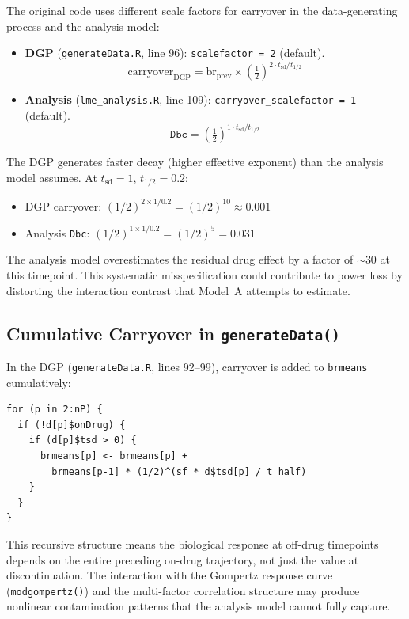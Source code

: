 \documentclass[11pt]{article}
\begin{document}
The original code uses different scale factors for carryover in the
data-generating process and the analysis model:

\begin{itemize}[nosep]
  \item \textbf{DGP} (\texttt{generateData.R}, line 96):
    \texttt{scalefactor = 2} (default).
    \[
      \text{carryover}_{\text{DGP}} =
        \text{br}_{\text{prev}} \times
        \left(\tfrac{1}{2}\right)^{2 \cdot t_{\text{sd}} / t_{1/2}}
    \]

  \item \textbf{Analysis} (\texttt{lme\_analysis.R}, line 109):
    \texttt{carryover\_scalefactor = 1} (default).
    \[
      \texttt{Dbc} =
        \left(\tfrac{1}{2}\right)^{1 \cdot t_{\text{sd}} / t_{1/2}}
    \]
\end{itemize}

The DGP generates faster decay (higher effective exponent) than the
analysis model assumes. At $t_{\text{sd}} = 1$, $t_{1/2} = 0.2$:

\begin{itemize}[nosep]
  \item DGP carryover: $(1/2)^{2 \times 1/0.2} = (1/2)^{10}
    \approx 0.001$
  \item Analysis \texttt{Dbc}: $(1/2)^{1 \times 1/0.2} = (1/2)^{5}
    = 0.031$
\end{itemize}

The analysis model overestimates the residual drug effect by a factor
of $\sim$30 at this timepoint. This systematic misspecification could
contribute to power loss by distorting the interaction contrast that
Model~A attempts to estimate.

\subsection{Cumulative Carryover in \texttt{generateData()}}

In the DGP (\texttt{generateData.R}, lines 92--99), carryover is
added to \texttt{brmeans} cumulatively:

\begin{verbatim}
for (p in 2:nP) {
  if (!d[p]$onDrug) {
    if (d[p]$tsd > 0) {
      brmeans[p] <- brmeans[p] +
        brmeans[p-1] * (1/2)^(sf * d$tsd[p] / t_half)
    }
  }
}
\end{verbatim}

This recursive structure means the biological response at off-drug
timepoints depends on the entire preceding on-drug trajectory, not
just the value at discontinuation. The interaction with the Gompertz
response curve (\texttt{modgompertz()}) and the multi-factor
correlation structure may produce nonlinear contamination patterns
that the analysis model cannot fully capture.
\end{document}

